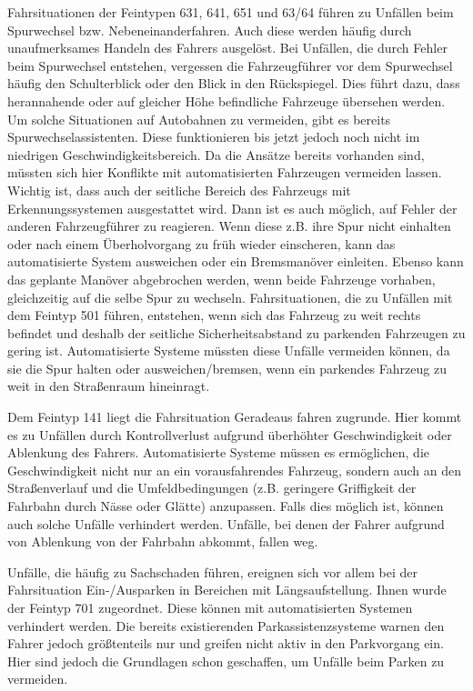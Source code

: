 Fahrsituationen der Feintypen 631, 641, 651 und 63/64 führen zu Unfällen beim Spurwechsel bzw. Nebeneinanderfahren. Auch diese werden häufig durch unaufmerksames Handeln des Fahrers ausgelöst. Bei Unfällen, die durch Fehler beim Spurwechsel entstehen, vergessen die Fahrzeugführer vor dem Spurwechsel häufig den Schulterblick oder den Blick in den Rückspiegel. Dies führt dazu, dass herannahende oder auf gleicher Höhe befindliche Fahrzeuge übersehen werden. Um solche Situationen auf Autobahnen zu vermeiden, gibt es bereits Spurwechselassistenten. Diese funktionieren bis jetzt jedoch noch nicht im niedrigen Geschwindigkeitsbereich. Da die Ansätze bereits vorhanden sind, müssten sich hier Konflikte mit automatisierten Fahrzeugen vermeiden lassen. Wichtig ist, dass auch der seitliche Bereich des Fahrzeugs mit Erkennungssystemen ausgestattet wird. Dann ist es auch möglich, auf Fehler der anderen Fahrzeugführer zu reagieren. Wenn diese z.B. ihre Spur nicht einhalten oder nach einem Überholvorgang zu früh wieder einscheren, kann das automatisierte System ausweichen oder ein Bremsmanöver einleiten. Ebenso kann das geplante Manöver abgebrochen werden, wenn beide Fahrzeuge vorhaben, gleichzeitig auf die selbe Spur zu wechseln. Fahrsituationen, die zu Unfällen mit dem Feintyp 501 führen, entstehen, wenn sich das Fahrzeug zu weit rechts befindet und deshalb der seitliche Sicherheitsabstand zu parkenden Fahrzeugen zu gering ist. Automatisierte Systeme müssten diese Unfälle vermeiden können, da sie die Spur halten oder ausweichen/bremsen, wenn ein parkendes Fahrzeug zu weit in den Straßenraum hineinragt.

Dem Feintyp 141 liegt die Fahrsituation Geradeaus fahren zugrunde. Hier kommt es zu Unfällen durch Kontrollverlust aufgrund überhöhter Geschwindigkeit oder Ablenkung des Fahrers. Automatisierte Systeme müssen es ermöglichen, die Geschwindigkeit nicht nur an ein vorausfahrendes Fahrzeug, sondern auch an den Straßenverlauf und die Umfeldbedingungen (z.B. geringere Griffigkeit der Fahrbahn durch Nässe oder Glätte) anzupassen. Falls dies möglich ist, können auch solche Unfälle verhindert werden. Unfälle, bei denen der Fahrer aufgrund von Ablenkung von der Fahrbahn abkommt, fallen weg.

Unfälle, die häufig zu Sachschaden führen, ereignen sich vor allem bei der Fahrsituation Ein-/Ausparken in Bereichen mit Längsaufstellung. Ihnen wurde der Feintyp 701 zugeordnet. Diese können mit automatisierten Systemen verhindert werden. Die bereits existierenden Parkassistenzsysteme warnen den Fahrer jedoch größtenteils nur und greifen nicht aktiv in den Parkvorgang ein. Hier sind jedoch die Grundlagen schon geschaffen, um Unfälle beim Parken zu vermeiden.

